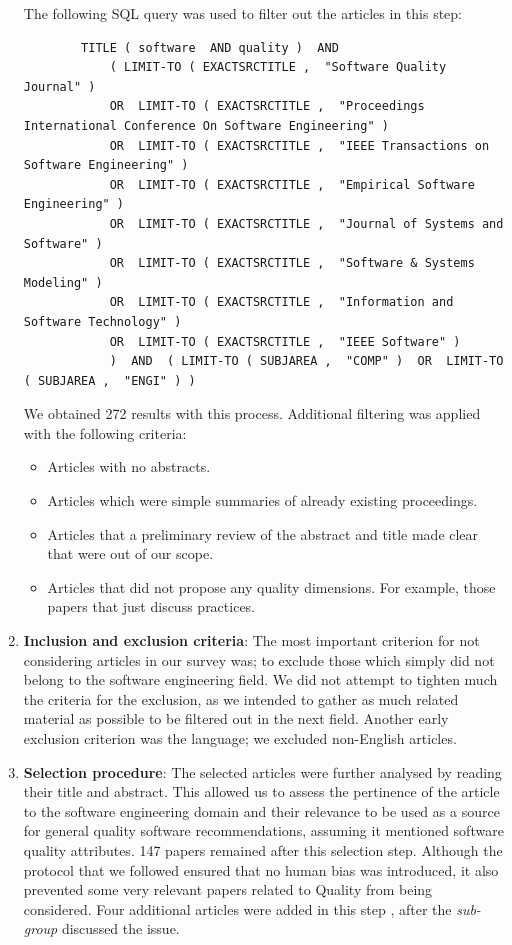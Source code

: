\documentclass[a4paper]{article}
\begin{document}
\begin{enumerate}
    The following SQL query was used to filter out the articles in this step:
    \begin{tiny}
    \begin{verbatim}
        TITLE ( software  AND quality )  AND  
            ( LIMIT-TO ( EXACTSRCTITLE ,  "Software Quality Journal" )  
            OR  LIMIT-TO ( EXACTSRCTITLE ,  "Proceedings International Conference On Software Engineering" ) 
            OR  LIMIT-TO ( EXACTSRCTITLE ,  "IEEE Transactions on Software Engineering" )
            OR  LIMIT-TO ( EXACTSRCTITLE ,  "Empirical Software Engineering" ) 
            OR  LIMIT-TO ( EXACTSRCTITLE ,  "Journal of Systems and Software" ) 
            OR  LIMIT-TO ( EXACTSRCTITLE ,  "Software & Systems Modeling" ) 
            OR  LIMIT-TO ( EXACTSRCTITLE ,  "Information and Software Technology" )  
            OR  LIMIT-TO ( EXACTSRCTITLE ,  "IEEE Software" )   
            )  AND  ( LIMIT-TO ( SUBJAREA ,  "COMP" )  OR  LIMIT-TO ( SUBJAREA ,  "ENGI" ) )  
    \end{verbatim}
    \end{tiny}

    We obtained 272 results with this process. Additional filtering was applied with the following criteria:
    \begin{itemize}
        \item Articles with no abstracts.
        \item Articles which were simple summaries of already existing proceedings.
        \item Articles that a preliminary review of the abstract and title made clear that were out of our scope.
        \item Articles that did not propose any quality dimensions. For example, those papers that just discuss practices.
    \end{itemize}

    \item \textbf{Inclusion and exclusion criteria}: The most important criterion for not considering articles in our survey was; to exclude those which simply did not belong to the software engineering field. We did not attempt to tighten much the criteria for the exclusion, as we intended to gather as much related material as possible to be filtered out in the next field. Another early exclusion criterion was the language; we excluded non-English articles.

    \item \textbf{Selection procedure}: The selected articles were further analysed by reading their title and abstract. This allowed us to assess the pertinence of the article to the software engineering domain and their relevance to be used as a source for general quality software recommendations, assuming it mentioned software quality attributes. 147 papers remained after this selection step. Although the protocol that we followed ensured that no human bias was introduced, it also prevented some very relevant papers related to Quality from being considered. Four additional articles were added in this step \cite{orviz_set_2017,orviz_fernandez_eosc-synergy_2020,raymond_software_2013,shepherdson_cessda_2019}, after the \textit{sub-group} discussed the issue.


\end{enumerate}
\end{document}
